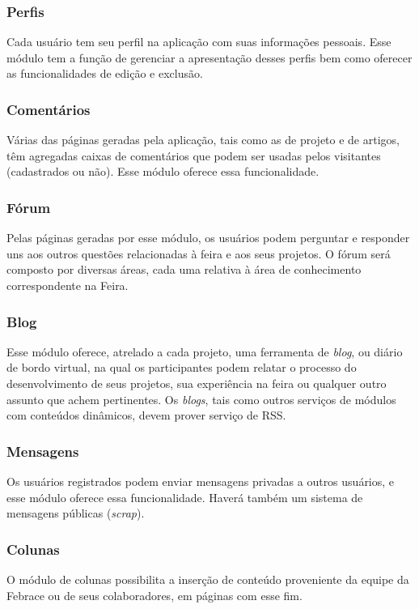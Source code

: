     \subsubsection{Perfis}
      Cada usuário tem seu perfil na aplicação com suas informações pessoais. Esse módulo tem a função de gerenciar a apresentação desses perfis bem como oferecer as funcionalidades de edição e exclusão.

    \subsubsection{Comentários}
      Várias das páginas geradas pela aplicação, tais como as de projeto e de artigos, têm agregadas caixas de comentários que podem ser usadas pelos visitantes (cadastrados ou não). Esse módulo oferece essa funcionalidade.

    \subsubsection{Fórum}
      Pelas páginas geradas por esse módulo, os usuários podem perguntar e responder uns aos outros questões relacionadas à feira e aos seus projetos. O fórum será composto por diversas áreas, cada uma relativa à área de conhecimento correspondente na Feira.

    \subsubsection{Blog}
      Esse módulo oferece, atrelado a cada projeto, uma ferramenta de \textit{blog}, ou diário de bordo virtual, na qual os participantes podem relatar o processo do desenvolvimento de seus projetos, sua experiência na feira ou qualquer outro assunto que achem pertinentes. Os \textit{blogs}, tais como outros serviços de módulos com conteúdos dinâmicos, devem prover serviço de RSS.

    \subsubsection{Mensagens}
      Os usuários registrados podem enviar mensagens privadas a outros usuários, e esse módulo oferece essa funcionalidade. Haverá também um sistema de mensagens públicas (\textit{scrap}).

    \subsubsection{Colunas}
      O módulo de colunas possibilita a inserção de conteúdo proveniente da equipe da Febrace ou de seus colaboradores, em páginas com esse fim.

